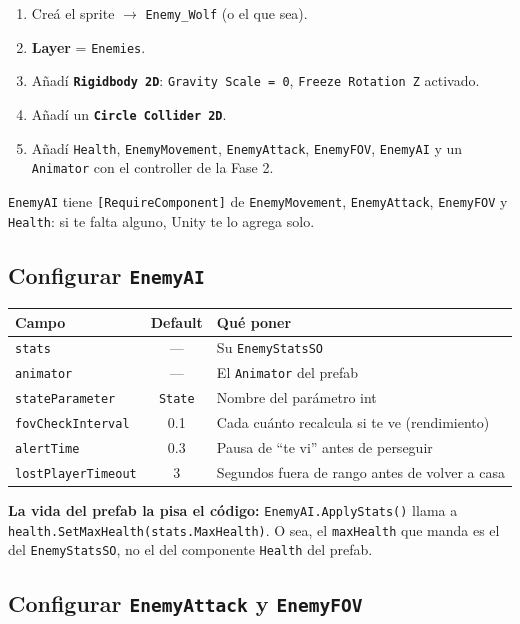 \documentclass[a4paper,12pt]{article}
\newcommand{\code}[1]{\texttt{#1}}
\begin{document}
\begin{enumerate}
    \item Creá el sprite $\to$ \code{Enemy\_Wolf} (o el que sea).
    \item \textbf{Layer} = \code{Enemies}.
    \item Añadí \textbf{\code{Rigidbody 2D}}: \code{Gravity Scale = 0}, \code{Freeze Rotation Z} activado.
    \item Añadí un \textbf{\code{Circle Collider 2D}}.
    \item Añadí \code{Health}, \code{EnemyMovement}, \code{EnemyAttack}, \code{EnemyFOV},
    \code{EnemyAI} y un \code{Animator} con el controller de la Fase 2.
\end{enumerate}

\code{EnemyAI} tiene \code{[RequireComponent]} de \code{EnemyMovement}, \code{EnemyAttack},
\code{EnemyFOV} y \code{Health}: si te falta alguno, Unity te lo agrega solo.

\subsection{Configurar \code{EnemyAI}}

\begin{center}
\begin{tabular}{|l|c|p{6.4cm}|}
\hline
\textbf{Campo} & \textbf{Default} & \textbf{Qué poner} \\
\hline
\code{stats} & --- & Su \code{EnemyStatsSO} \\
\hline
\code{animator} & --- & El \code{Animator} del prefab \\
\hline
\code{stateParameter} & \code{State} & Nombre del parámetro int \\
\hline
\code{fovCheckInterval} & 0.1 & Cada cuánto recalcula si te ve (rendimiento) \\
\hline
\code{alertTime} & 0.3 & Pausa de ``te vi'' antes de perseguir \\
\hline
\code{lostPlayerTimeout} & 3 & Segundos fuera de rango antes de volver a casa \\
\hline
\end{tabular}
\end{center}

\textbf{La vida del prefab la pisa el código:} \code{EnemyAI.ApplyStats()} llama a
\code{health.SetMaxHealth(stats.MaxHealth)}. O sea, el \code{maxHealth} que manda es el del
\code{EnemyStatsSO}, no el del componente \code{Health} del prefab.

\subsection{Configurar \code{EnemyAttack} y \code{EnemyFOV}}
\end{document}
